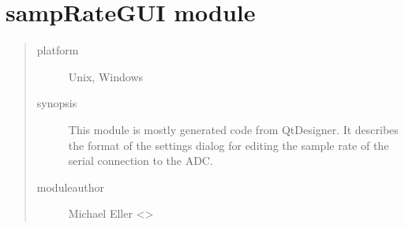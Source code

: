 \documentclass[letterpaper,10pt,english]{sphinxmanual}
\begin{document}
\section{sampRateGUI module}
\label{\detokenize{sampRateGUI:module-sampRateGUI}}\label{\detokenize{sampRateGUI:samprategui-module}}\label{\detokenize{sampRateGUI::doc}}\begin{quote}\begin{description}
\item[{platform}] \leavevmode
Unix, Windows

\item[{synopsis}] \leavevmode
This module is mostly generated code from QtDesigner. It describes the format of the settings
dialog for editing the sample rate of the serial connection to the ADC.

\item[{moduleauthor}] \leavevmode
Michael Eller \textless{}\textgreater{}

\end{description}\end{quote}
\end{document}
